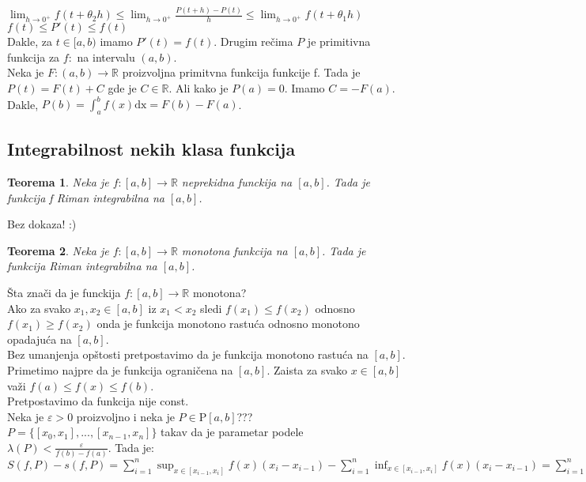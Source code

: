 \documentclass{article}
\newtheorem{teorema}{Teorema}[section]
\begin{document}
$\displaystyle \lim_{h\rightarrow 0^+} f(t+\theta_2h) \leq \lim_{h\rightarrow 0^+} \frac{P(t + h) - P(t)}{h} \leq \lim_{h\rightarrow 0^+} f(t+\theta_1h)$\\
$f(t) \leq P'(t) \leq f(t)$\\
Dakle, za $t \in [a, b)$ imamo $P'(t) = f(t)$. Drugim rečima $P$ je primitivna funkcija za $f:$ na intervalu $(a, b)$.\\
Neka je $F: (a, b) \rightarrow \mathbb{R}$ proizvoljna primitvna funkcija funkcije f. Tada je $P(t) = F(t) + C$ gde je $C \in \mathbb{R}$. Ali kako je $P(a) = 0$. Imamo $C = -F(a)$.\\
Dakle, $P(b) = \displaystyle \int^b_a f(x) \text{dx} = F(b) - F(a)$.
\subsection{Integrabilnost nekih klasa funkcija}
\begin{teoremabox}
    \begin{teorema}
        Neka je $f: [a, b] \rightarrow \mathbb{R}$ neprekidna funckija na $[a, b]$. Tada je funkcija f Riman integrabilna na $[a, b]$.
    \end{teorema}
    Bez dokaza! :)
\end{teoremabox}
\begin{teoremabox}
    \begin{teorema}
        Neka je $f: [a, b] \rightarrow \mathbb{R}$ monotona funkcija na $[a, b]$. Tada je funkcija Riman integrabilna na $[a, b]$.
    \end{teorema}
\end{teoremabox}
Šta znači da je funckija $f:[a, b] \rightarrow \mathbb{R}$ monotona?\\
Ako za svako $x_1, x_2 \in [a, b]$ iz $x_1 < x_2$ sledi $f(x_1) \leq f(x_2)$ odnosno $f(x_1) \geq f(x_2)$ onda je funkcija monotono rastuća odnosno monotono opadajuća na $[a, b]$.\\
Bez umanjenja opštosti pretpostavimo da je funkcija monotono rastuća na $[a, b]$. Primetimo najpre da je funkcija ograničena na $[a,b]$. Zaista za svako $x \in [a, b]$ važi $f(a) \leq f(x) \leq f(b)$.\\
Pretpostavimo da funkcija nije const.\\
Neka je $\varepsilon > 0$ proizvoljno i neka je $P \in \text{P}[a, b]$??? $P =\{[x_0, x_1], ..., [x_{n-1}, x_n]\}$ takav da je parametar podele $\lambda(P) < \frac{\varepsilon}{f(b) - f(a)}$. Tada je: \\
$S(f, P) - s(f, P) = \displaystyle \sum^n_{i = 1}\sup_{x\in[x_{i-1}, x_i]}f(x)(x_i - x_{i-1}) - \sum^n_{i = 1}\inf_{x\in[x_{i-1}, x_i]}f(x)(x_i - x_{i-1}) = \sum_{i=1}^n(f(x_i)-f(x_{i-1})(x_i - x_{i-1}) < \sum^n_{i=1}(f(x_i) - f(x_{i-1}))\frac{\varepsilon}{f(b) - f(a)} = \frac{\varepsilon}{f(b) - f(a)}\sum^n_{i=1}(f(x_i) - f(x_{i-1})) = \frac{\varepsilon}{f(b) - f(a)} (f(b) - f(a)) = \varepsilon$
\end{document}
